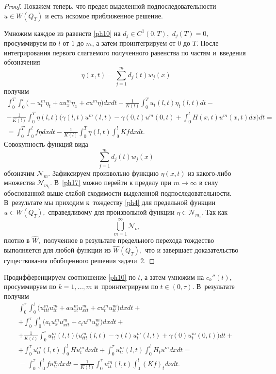 \begin{proof}
Покажем теперь, что предел выделенной подпоследовательности $u{\in} W(Q_T)$ и есть искомое приближенное решение.

Умножим каждое из равенств \eqref{ph10} на $d_j\in C^1(0,T),$ $ d_j(T)=0,$ просуммируем по $l$ от $1$ до
 $m$, а затем проинтегрируем от $0$ до $T$. 
 После интегрирования первого слагаемого  полученного равенства по частям и~введения обозначения 
$$
\eta(x,t)=\sum\limits_{j=1}^md_j(t)w_j(x)
$$
получим
\begin{multline}
\int _0^T \int _0^l \bigl(-u^m_t\eta_t+au^m_x\eta_x+cu^m\eta\bigr)dxdt-
\frac{1}{K(l)} \int _0^Tu_t(l,t)\eta_t(l,t)dt-
\\
-\frac{1}{K(l)}  \int _0^T\eta(l,t) 
\biggl( \gamma(l,t)u^m(l,t)-
\gamma(0, t)u^m(0, t)+ \int _0^lH(x,t)u^m(x,t)dx\biggr) dt=
\\
 \label{ph17}
= \int _0^T \int _0^lf\eta dxdt- \frac{1}{K(l)} \int _0^T\eta(l,t) \int _0^lKfdxdt.
\end{multline}
Совокупность функций вида $$\sum\limits_{j=1}^md_j(t)w_j(x)$$ обозначим $\mathcal{N}_m.$
Зафиксируем произвольно функцию $\eta(x,t)$ из какого-либо множества $\mathcal{N}_{m_i}.$
В~\eqref{ph17}  можно перейти к пределу при $m\rightarrow \infty$ в силу обоснованной выше слабой сходимости выделенной подпоследовательности.  
В~результате  мы приходим к~тождеству \eqref{ph4} для предельной функции $u\in W(Q_T),$ справедливому для произвольной
функции $\eta \in \mathcal{N}_{m_i}.$
Так как $$\bigcup\limits_{m=1}^{\infty}\mathcal{N}_m$$ плотно в $\hat{W},$
полученное в результате предельного перехода тождество
выполняется для любой функции из $ \hat{W}(Q_T), $ что и завершает доказательство существования
обобщенного решения задачи~\hyperlink{sav:task2}{2}. 
\end{proof}


Продифференцируем соотношение \eqref{ph10} по $t$, а затем умножим на $c_k''(t)$, просуммируем по $k=1,\dots,m$ и~проинтегрируем по $t\in (0,\tau)$. 
В~результате получим
\begin{multline}
\int _0^{\tau} \int _0^l \bigl(u^m_{ttt}u^m_{tt}+au^m_{xt}u^m_{xtt}+cu^m_tu^m_{tt} \bigr)dxdt+
\\
+ \int _0^{\tau} \int _0^l \bigl(a_tu^m_xu^m_{xtt}+c_tu^mu^m_{tt} \bigr)dxdt+
\\
+\frac{1}{K(l)} \int _0^{\tau}u^m_{tt}(l,t) \bigl(u^m_{ttt}(l,t)-\gamma(l)u^m_t(l,t)+\gamma(0)
u^m_t(0, t)\bigr)dt+
\\
+ \int _0^{\tau}u^m_{tt}(l,t) \int _0^lHu^m_tdxdt+  \int _0^{\tau}u^m_{tt}(l,t) \int _0^lH_tu^mdxdt=
 \\
= \int _0^{\tau} \int _0^lfu^m_{tt}dxdt-
\frac{1}{K(l)} \int _0^{\tau}u^m_{tt}(l,t) \int _0^l(Kf)_tdxdt.
\end{multline}

